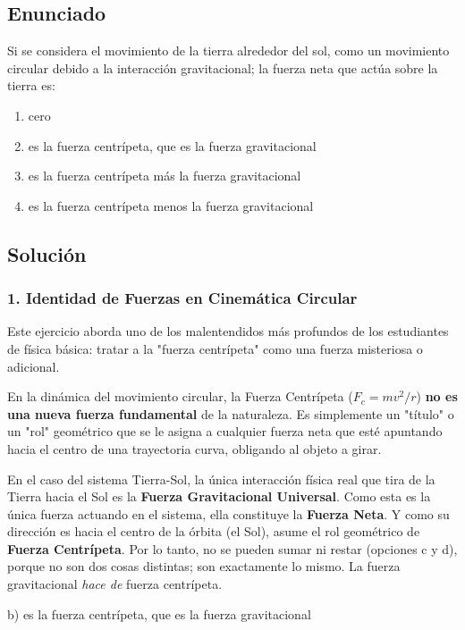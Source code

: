 \documentclass[12pt, a4paper]{article}
\begin{document}
\newpage

\subsection*{Enunciado}
Si se considera el movimiento de la tierra alrededor del sol, como un movimiento circular debido a la interacción gravitacional; la fuerza neta que actúa sobre la tierra es:
\begin{enumerate}[label=\alph*)]
    \item cero
    \item es la fuerza centrípeta, que es la fuerza gravitacional
    \item es la fuerza centrípeta más la fuerza gravitacional
    \item es la fuerza centrípeta menos la fuerza gravitacional
\end{enumerate}

\subsection*{Solución}

\subsubsection*{1. Identidad de Fuerzas en Cinemática Circular}
Este ejercicio aborda uno de los malentendidos más profundos de los estudiantes de física básica: tratar a la "fuerza centrípeta" como una fuerza misteriosa o adicional.

En la dinámica del movimiento circular, la Fuerza Centrípeta ($F_c = mv^2/r$) \textbf{no es una nueva fuerza fundamental} de la naturaleza. Es simplemente un "título" o un "rol" geométrico que se le asigna a cualquier fuerza neta que esté apuntando hacia el centro de una trayectoria curva, obligando al objeto a girar.

En el caso del sistema Tierra-Sol, la única interacción física real que tira de la Tierra hacia el Sol es la \textbf{Fuerza Gravitacional Universal}. Como esta es la única fuerza actuando en el sistema, ella constituye la \textbf{Fuerza Neta}. Y como su dirección es hacia el centro de la órbita (el Sol), asume el rol geométrico de \textbf{Fuerza Centrípeta}.
Por lo tanto, no se pueden sumar ni restar (opciones c y d), porque no son dos cosas distintas; son exactamente lo mismo. La fuerza gravitacional \textit{hace de} fuerza centrípeta.

\begin{tcolorbox}[colback=green!5!white, colframe=green!50!black, title=Respuesta Final]
\centering \Large b) es la fuerza centrípeta, que es la fuerza gravitacional
\end{tcolorbox}
\end{document}
